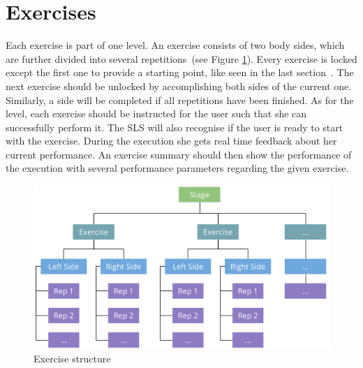 \section{Exercises}\label{4_4_exercises}
Each exercise is part of one level. An exercise consists of two body sides, which are further divided into several repetitions~(see Figure \ref{fig:exerciseStructure}). Every exercise is locked except the first one to provide a starting point, like seen in the last section~. The next exercise should be unlocked by accomplishing both sides of the current one. Similarly, a side will be completed if all repetitions have been finished. As for the level, each exercise should be instructed for the user such that she can successfully perform it. The SLS will also recognise if the user is ready to start with the exercise. During the execution she gets real time feedback about her current performance. An exercise summary should then show the performance of the execution with several performance parameters regarding the given exercise.
\begin{figure}[htb]
	\centering
	\begin{minipage}[t]{1\linewidth}
		\centering
		\includegraphics[width=1\linewidth]{Pictures/exerciseStructureTopDown2}
		\caption{Exercise structure}
		\label{fig:exerciseStructure}
	\end{minipage}
\end{figure}

